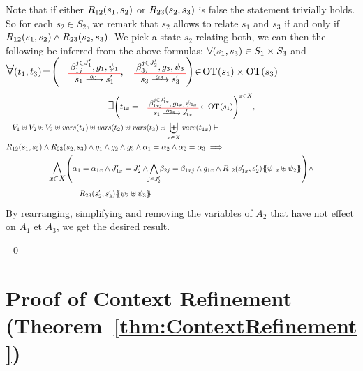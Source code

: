 \documentclass[runningheads]{llncs}
\begin{document}
\begin{enumerate}
Note that if  either $R_{12}{\left(s_1, s_2\right)}$ or $R_{23}{\left(s_2, s_3\right)}$ is false the statement trivially holds.
So for each $s_2 \in S_2$, we remark that  $s_2$  allows to relate $s_1$ and $s_3$ if and only if $R_{12}{\left(s_1, s_2\right)}\land R_{23}{\left(s_2, s_3\right)} $. We pick a state $s_2$ relating both,  we can then the following be inferred from the above formulas:
$\forall {\left(s_1,s_3\right)} \in S_1 \times S_3$ and\\ $\bigsymb{\forall} \mpar{t_1, t_{3}}\!=\! \mpar{\OTx{1}{}{1}{1},\OTx{3}{}{3}{3}}\! \in\! \fOT{s_1} \times \fOT{s_3}$  
\begin{multline*}
\bigsymb{\bigexists} 
\mpar{t_{1x} = \OTx{1}{x}{1x}{1x} \in \fOT{s_1}}^{x \in X},\\
 V_1 \uplus V_2 \uplus V_3 \uplus \fvars{t_1} \uplus \fvars{t_2} \uplus \fvars{t_3} \uplus \biguplus_{x\in X}\fvars{t_{1x}}     \vdash \hspace{6cm}\\  R_{12}\mpar{s_1, s_2} \wedge R_{23}\mpar{s_2, s_3} \wedge 	g_1 \wedge g_2 \wedge   g_3\wedge  \alpha_1 = \alpha_2  \wedge \alpha_2 = \alpha_3 
\implies \hspace{6cm}\\
\bigsymb{\bigwedge_{x\in X}}
\mpar{
\alpha_1=\alpha_{1 x}  \land J'_{1x}= J'_2 \land \bigwedge_\subbox{j \in J'_2 } \beta_{2j} = \beta_{1xj}\land g_{1 x}\land
 R_{12}\mpar{s'_{1 x}, s'_2}\psubst{\psi_{1 x} \uplus \psi_2}} \wedge\\ R_{23}\mpar{s'_{2}, s'_3}\psubst{\psi_{2} \uplus \psi_3}\hspace{6cm}\\
\end{multline*}
By rearranging, simplifying and removing the variables of $A_2$ that have not effect on   $A_1$ et  $A_3$, we get the desired result.




\end{enumerate}

~\qed















\section{Proof of Context Refinement (Theorem~\ref{thm:ContextRefinement})}
\end{document}
